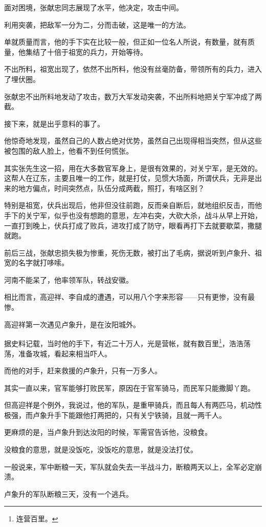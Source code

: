 \begin{multicols}{\theparacolNo}
面对困境，张献忠同志展现了水平，他决定，攻击中间。

利用突袭，把敌军一分为二，分而击破，这是唯一的方法。

单就质量而言，他的手下实在比较一般，但正如一位名人所说，有数量，就有质量，他集结了十倍于祖宽的兵力，开始等待。

不出所料，祖宽出现了，依然不出所料，他没有丝毫防备，带领所有的兵力，进入了埋伏圈。

张献忠不出所料地发动了攻击，数万大军发动突袭，不出所料地把关宁军冲成了两截。

接下来，就是出乎意料的事了。

他惊奇地发现，虽然自己的人数占绝对优势，虽然自己出现得相当突然，但从这些被包围的敌人脸上，他看不到任何慌张。

其实张先生这一招，用在大多数官军身上，是很有效果的，对关宁军，是无效的。这帮人在辽东，主要且唯一的工作，就是打仗，见惯大场面，所谓伏兵，无非是出来的地方偏点，时间突然点，队伍分成两截，照打，有啥区别？

特别是祖宽，伏兵出现后，他非但没往前跑，反而亲自断后，就地组织反击，而他手下的关宁军，似乎也没有想跑的意思，左冲右突，大砍大杀，战斗从早上开始，一直打到晚上，伏兵打成了败兵，进攻打成了防守，眼看再打下去就要歇菜，撒腿就跑。

前后三战，张献忠损失极为惨重，死伤无数，被打出了毛病，据说听到卢象升、祖宽的名字就打哆嗦。

河南不能呆了，他率领军队，转战安徽。

相比而言，高迎祥、李自成的遭遇，可以用八个字来形容——只有更惨，没有最惨。

高迎祥第一次遇见卢象升，是在汝阳城外。

据史料记载，当时他的手下，有近二十万人，光是营帐，就有数百里\footnote{连营百里。}，浩浩荡荡，准备攻城，看起来相当吓人。

而他的对手，赶来救援的卢象升，只有一万多人。

其实一直以来，官军能够打败民军，原因在于官军骑马，而民军只能撒脚丫跑。

但高迎祥是个例外，我说过，他的军队，是重甲骑兵，而且每人有两匹马，机动性极强，而卢象升手下能跟他打两把的，只有关宁铁骑，且就一两千人。

更麻烦的是，当卢象升到达汝阳的时候，军需官告诉他，没粮食。

没粮食的意思，就是没饭吃，没饭吃的意思，就是没法打仗。

一般说来，军中断粮一天，军队就会失去一半战斗力，断粮两天以上，全军必定崩溃。

卢象升的军队断粮三天，没有一个逃兵。


\end{multicols}
